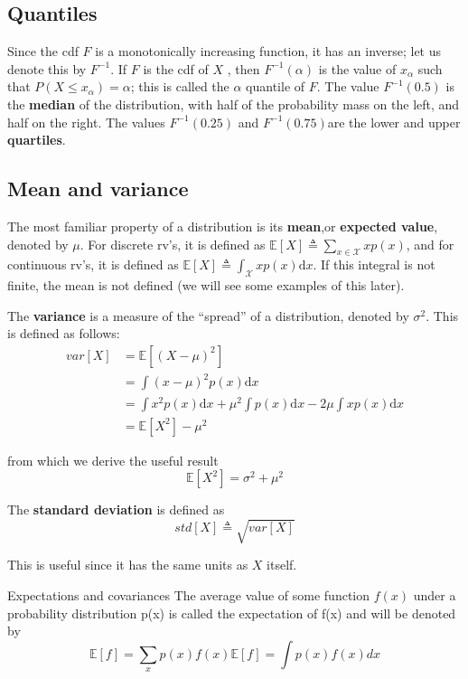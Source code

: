 \subsection{Quantiles}
Since the cdf $F$ is a monotonically increasing function, it has an inverse; let us denote this by $F^{-1}$. If $F$ is the cdf of $X$ , then $F^{-1}(\alpha)$ is the value of $x_{\alpha}$ such that $P(X \leq x_{\alpha})=\alpha$; this is called the $\alpha$ quantile of $F$. The value $F^{-1}(0.5)$ is the \textbf{median} of the distribution, with half of the probability mass on the left, and half on the right. The values $F^{-1}(0.25)$ and $F^{−1}(0.75)$are the lower and upper \textbf{quartiles}.

\subsection{Mean and variance}
The most familiar property of a distribution is its \textbf{mean},or \textbf{expected value}, denoted by $\mu$. For discrete rv’s, it is defined as $\mathbb{E}[X] \triangleq \sum_{x \in \mathcal{X}}xp(x)$, and for continuous rv’s, it is defined as $\mathbb{E}[X] \triangleq \int_{\mathcal{X}}xp(x)\mathrm{d}x$. If this integral is not finite, the mean is not defined (we will see some examples of this later). 

The \textbf{variance} is a measure of the “spread” of a distribution, denoted by $\sigma^2$. This is defined as follows:
\begin{align}
var[X]& =\mathbb{E}[(X-\mu)^2] \\
      & =\int{(x-\mu)^2p(x)\mathrm{d}x} \nonumber \\
      & =\int{x^2p(x)\mathrm{d}x}+{\mu}^2\int{p(x)\mathrm{d}x}-2\mu\int{xp(x)\mathrm{d}x} \nonumber \\
	  & =\mathbb{E}[X^2]-{\mu}^2
\end{align}

from which we derive the useful result
\begin{equation}
\mathbb{E}[X^2]=\sigma^2+{\mu}^2
\end{equation}

The \textbf{standard deviation} is defined as
\begin{equation}
std[X] \triangleq \sqrt{var[X]}
\end{equation}

This is useful since it has the same units as $X$ itself.

Expectations and covariances
The average value of some function $f(x)$ under a probability distribution p(x) is called the expectation of f(x) and
will be denoted by 
\begin{equation}
                                  \mathbb{E}[f] = \sum_{x}p(x)f(x)
                                  \mathbb{E}[f] = \int p(x)f(x)dx
\end{equation}

